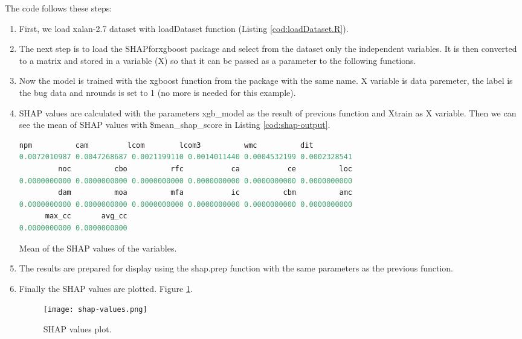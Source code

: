 The code follows these steps:

\begin{enumerate}
    \item First, we load xalan-2.7 dataset with loadDataset function (Listing \ref{cod:loadDataset.R}).
    
    \item The next step is to load the SHAPforxgboost package and select from the dataset only the independent variables. It is then converted to a matrix and stored in a variable (X) so that it can be passed as a parameter to the following functions.
    
    \item Now the model is trained with the xgboost function from the package with the same name. X variable is data paremeter, the label is the bug data and nrounds is set to 1 (no more is needed for this example).
    
    \item SHAP values are calculated with the parameters xgb\_model as the result of previous function and Xtrain as X variable. Then we can see the mean of SHAP values with \$mean\_shap\_score in Listing \ref{cod:shap-output}.
    
\begin{codefloat}[H]
\begin{lstlisting}[language=R, style=console]
         npm          cam         lcom        lcom3          wmc          dit 
0.0072010987 0.0047268687 0.0021199110 0.0014011440 0.0004532199 0.0002328541 
         noc          cbo          rfc           ca           ce          loc 
0.0000000000 0.0000000000 0.0000000000 0.0000000000 0.0000000000 0.0000000000 
         dam          moa          mfa           ic          cbm          amc 
0.0000000000 0.0000000000 0.0000000000 0.0000000000 0.0000000000 0.0000000000 
      max_cc       avg_cc 
0.0000000000 0.0000000000 
\end{lstlisting}
\caption{Mean of the SHAP values of the variables.}
\label{cod:shap-output}
\end{codefloat}

    \item The results are prepared for display using the shap.prep function with the same parameters as the previous function.
    
    \item Finally the SHAP values are plotted. Figure \ref{fig:shap-values-plot}.
        \begin{figure}[H]
            \centering
            \texttt{[image: shap-values.png]}
            \caption{SHAP values plot.}
            \label{fig:shap-values-plot}
        \end{figure}
    

\end{enumerate}
